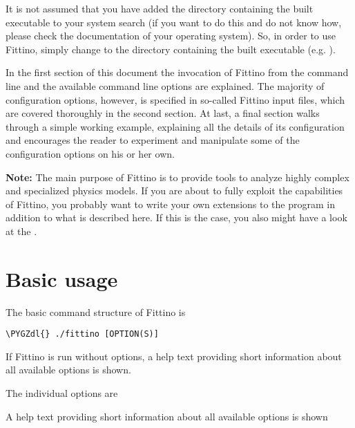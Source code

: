 \documentclass[letterpaper,10pt,english]{sphinxmanual}
\def\PYGZdl{\char`\$}
\begin{document}
It is not assumed that you have added the directory containing the built executable to your system
search  (if you want to do this and do not know how, please check the documentation of
your operating system). So, in order to use Fittino, simply change to the directory containing the
built executable (e.g.  ).

In the first section of this document the invocation of Fittino from the command line and the
available command line options are explained. The majority of configuration options, however, is
specified in so-called Fittino input files, which are covered thoroughly in the second section. At
last, a final section walks through a simple working example, explaining all the details of its
configuration and encourages the reader to experiment and manipulate some of the configuration
options on his or her own.

\textbf{Note:} The main purpose of Fittino is to provide tools to analyze highly complex and specialized
physics models. If you are about to fully exploit the capabilities of Fittino, you probably want to
write your own extensions to the program in addition to what is described here. If this is the case,
you also might have a look at the .


\section{Basic usage}
\label{basic_usage::doc}\label{basic_usage:basic-usage}
The basic command structure of Fittino is

\begin{Verbatim}[commandchars=\\\{\}]
\PYGZdl{} ./fittino [OPTION(S)]
\end{Verbatim}

If Fittino is run without options, a help text providing short information about all available
options is shown.

The individual options are

\begin{fulllineitems}
\label{basic_usage:cmdoption-h}
A help text providing short information about all available options is shown

\end{fulllineitems}
\end{document}
